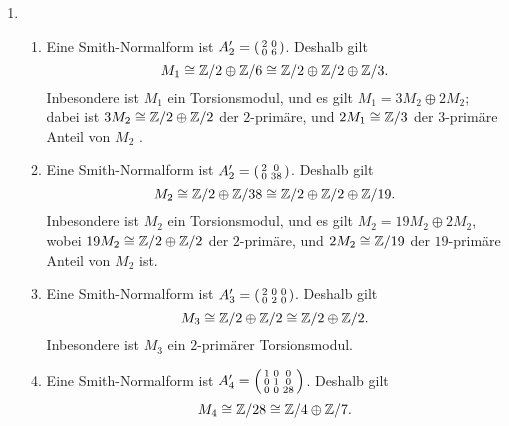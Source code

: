\begin{solution}
  \begin{enumerate}
    \item
      \begin{enumerate}
        \item
          Eine Smith-Normalform ist $A_2' = \begin{psmallmatrix} 2 & 0 \\ 0 & 6 \end{psmallmatrix}$.
          Deshalb gilt
          \[
                  M_1
            \cong \mathbb{Z}/2 \oplus \mathbb{Z}/6
            \cong \mathbb{Z}/2 \oplus \mathbb{Z}/2 \oplus \mathbb{Z}/3.
          \]
          Inbesondere ist $M_1$ ein Torsionsmodul, und es gilt $M_1 = 3 M_2 \oplus 2 M_2$;
          dabei ist $3 M_2 \cong \mathbb{Z}/2 \oplus \mathbb{Z}/2$ der $2$-primäre, und $2 M_1 \cong \mathbb{Z}/3$ der $3$-primäre Anteil von $M_2$ .
        \item
          Eine Smith-Normalform ist $A_2' = \begin{psmallmatrix} 2 & 0 \\ 0 & 38 \end{psmallmatrix}$.
          Deshalb gilt
          \[
                  M_2
            \cong \mathbb{Z}/2 \oplus \mathbb{Z}/38
            \cong \mathbb{Z}/2 \oplus \mathbb{Z}/2 \oplus \mathbb{Z}/19.
          \]
          Inbesondere ist $M_2$ ein Torsionsmodul, und es gilt $M_2 = 19 M_2 \oplus 2 M_2$, wobei $19 M_2 \cong \mathbb{Z}/2 \oplus \mathbb{Z}/2$ der $2$-primäre, und $2 M_2 \cong \mathbb{Z}/19$ der $19$-primäre Anteil von $M_2$ ist.
        \item
          Eine Smith-Normalform ist $A_3' = \begin{psmallmatrix} 2 & 0 & 0 \\ 0 & 2 & 0 \end{psmallmatrix}$.
          Deshalb gilt
          \[
                  M_3
            \cong \mathbb{Z}/2 \oplus \mathbb{Z}/2
            \cong \mathbb{Z}/2 \oplus \mathbb{Z}/2.
          \]
          Inbesondere ist $M_3$ ein $2$-primärer Torsionsmodul.
        \item
          Eine Smith-Normalform ist $A_4' = \begin{psmallmatrix} 1 & 0 & 0 \\ 0 & 1 & 0 \\ 0 & 0 & 28 \end{psmallmatrix}$.
          Deshalb gilt
          \[
                  M_4
            \cong \mathbb{Z}/28
            \cong \mathbb{Z}/4 \oplus \mathbb{Z}/7.
\]
\end{enumerate}
\end{enumerate}
\end{solution}
